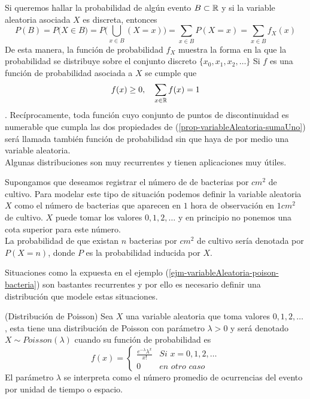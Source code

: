 Si queremos hallar la probabilidad de algún evento $B\subset{\mathbb{R}}$ y si la variable aleatoria asociada $X$ es discreta, entonces
$$P(B)=P\big(X\in B)=P\big(\bigcup_{x\in B}(X=x)\big)=\sum_{x\in B}P(X=x)=\sum_{x\in B}f_X(x)$$
De esta manera, la función de probabilidad $f_X$ muestra la forma en la que la probabilidad se distribuye sobre el conjunto discreto $\{x_0,x_1,x_2,\ldots\}$ 
Si $f$ es una función de probabilidad asociada a $X$ se cumple que 
\begin{eqnarray}
    f(x)\geq 0,\quad\sum_{x\in {\mathbb{R}}}f(x)=1 \label{prop-variableAleatoria-sumaUno}
\end{eqnarray}.
Recíprocamente, toda función cuyo conjunto de puntos de discontinuidad es numerable que cumpla las dos propiedades de (\ref{prop-variableAleatoria-sumaUno}) será llamada también función de probabilidad sin que haya de por medio una variable aleatoria.\\
Algunas distribuciones son muy recurrentes y tienen aplicaciones muy útiles.
\begin{Ejm}
\label{ejm-variableAleatoria-poison-bacteria}
    Supongamos que deseamos  registrar el número de de bacterias por $cm^2$ de cultivo. Para modelar este tipo de situación podemos definir la variable aleatoria $X$ como el número de bacterias que aparecen en $1$ hora de observación en $1 cm^2$ de cultivo. $X$ puede tomar los valores $0,1,2,\ldots$ y en principio no ponemos una cota superior para este número.\\La probabilidad de que existan $n$ bacterias por $cm^2$ de cultivo sería denotada por $P(X=n)$, donde $P$ es la probabilidad inducida por $X$.
\end{Ejm}
Situaciones como la expuesta en el ejemplo  (\ref{ejm-variableAleatoria-poison-bacteria}) son bastantes recurrentes y por ello es necesario definir una distribución que modele estas situaciones.
\begin{Def}(Distribución de Poisson)
    Sea $X$ una variable aleatoria que toma valores $0,1,2,\ldots$ , esta tiene una distribución de Poisson con parámetro $\lambda>0$ y será denotado $X\sim Poisson(\lambda)$ cuando su función de probabilidad es
    $$f(x)=\begin{cases}\frac{e^{-\lambda}\lambda^x}{x!}& \textit{Si }x=0,1,2,\ldots\\
    0 &\textit{en otro caso}
    \end{cases}$$
    El parámetro $\lambda$ se interpreta como el número promedio de ocurrencias del evento por unidad de tiempo o espacio.
\end{Def}
